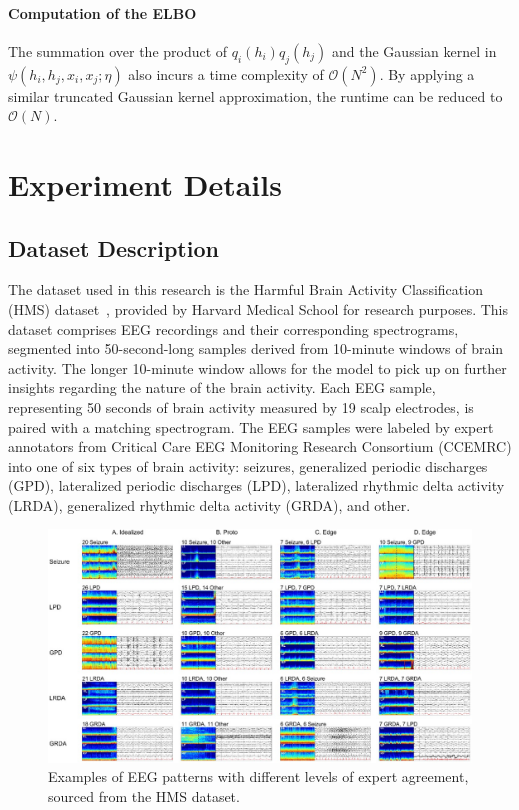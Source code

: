 \documentclass[conference]{IEEEtran}
\newcommand{\Oc}{\mathcal{O}}
\begin{document}
\paragraph{Computation of the ELBO}


The summation over the product of $q_i(h_i)q_j(h_j)$ and the Gaussian kernel
in $\psi(h_i, h_j, x_i, x_j; \eta)$ also incurs a time complexity of $\Oc(N^2)$.
By applying a similar truncated Gaussian kernel approximation, the runtime can
be reduced to $\Oc(N)$.


\section{Experiment Details}


\subsection{Dataset Description}


The dataset used in this research is the Harmful Brain Activity Classification
(HMS) dataset~\citep{jing2023development}, provided by Harvard Medical School
for research purposes. This dataset comprises EEG recordings and their
corresponding spectrograms, segmented into 50-second-long samples derived from
10-minute windows of brain activity.
The longer 10-minute window allows for the model to pick up on further insights
regarding the nature of the brain activity. Each EEG sample, representing 50
seconds of brain activity measured by 19 scalp electrodes, is paired with a
matching spectrogram.
The EEG samples were labeled by expert annotators from Critical Care EEG
Monitoring Research Consortium (CCEMRC) into one of six types of brain
activity: seizures, generalized periodic discharges (GPD), lateralized
periodic discharges (LPD), lateralized rhythmic delta activity (LRDA),
generalized rhythmic delta activity (GRDA), and other.


\begin{figure}[ht]
\centering
\includegraphics[width=.48\textwidth]{example}
\caption{Examples of EEG patterns with different levels of expert agreement,
sourced from the HMS dataset.}
\label{fig:ex}
\end{figure}
\end{document}
